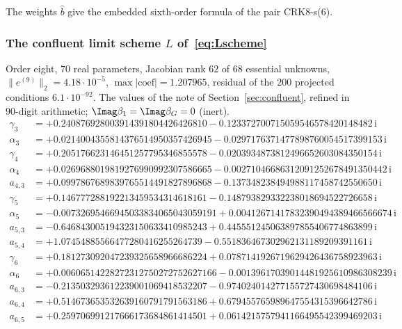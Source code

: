 The weights $\hat b$ give the embedded sixth-order formula of the pair CRK8-s(6).
\subsubsection*{The confluent limit scheme $L$ of~\eqref{eq:Lscheme}}
Order eight, $70$ real parameters, Jacobian rank $62$ of $68$ essential unknowns, $\|e^{(9)}\|_2=4.18\cdot10^{-5}$, $\max|\text{coef}|=1.207965$, residual of the $200$ projected conditions $6.1\cdot10^{-92}$. The values of the note of Section~\ref{sec:confluent}, refined in $90$-digit arithmetic; $\Imag\beta_1=\Imag\beta_G=0$ (inert).
{\small\allowdisplaybreaks
\begin{align*}
\gamma_{3} &= +0.240876928003914391804426426810 - 0.123372700715059546578420148482\,\mathrm{i}\\
\alpha_{3} &= +0.0214004355814376514950357426945 - 0.0297176371477898760054517399153\,\mathrm{i}\\
\gamma_{4} &= +0.205176623146451257795346855578 - 0.0203934873812496652603084350154\,\mathrm{i}\\
\alpha_{4} &= +0.0269688019819276990992307586665 - 0.00271046686312091252678491350442\,\mathrm{i}\\
a_{4,3} &= +0.0997867689839765514491827896868 - 0.137348238494988117458742550650\,\mathrm{i}\\
\gamma_{5} &= +0.146777288192213459534314618161 - 0.148793829332238018694522726658\,\mathrm{i}\\
\alpha_{5} &= -0.00732695466945033834065043059191 + 0.00412671417832390494389466566674\,\mathrm{i}\\
a_{5,3} &= -0.646843005194323150633410985243 + 0.445551245063897855406774863899\,\mathrm{i}\\
a_{5,4} &= +1.07454885566477280416255264739 - 0.551836467302962131189209391161\,\mathrm{i}\\
\gamma_{6} &= +0.181273092047239325658966686224 + 0.0787141926719629426436758923963\,\mathrm{i}\\
\alpha_{6} &= +0.00606514228272312750272752627166 - 0.00139617039014481925610986308239\,\mathrm{i}\\
a_{6,3} &= -0.213503293612239001069418532207 - 0.974024014277155727430698484106\,\mathrm{i}\\
a_{6,4} &= +0.514673653532639160791791563186 + 0.679455765989647554315396642786\,\mathrm{i}\\
a_{6,5} &= +0.259706991217666173684861414501 + 0.0614215757941166495542399469203\,\mathrm{i}\\

\end{align*}}
